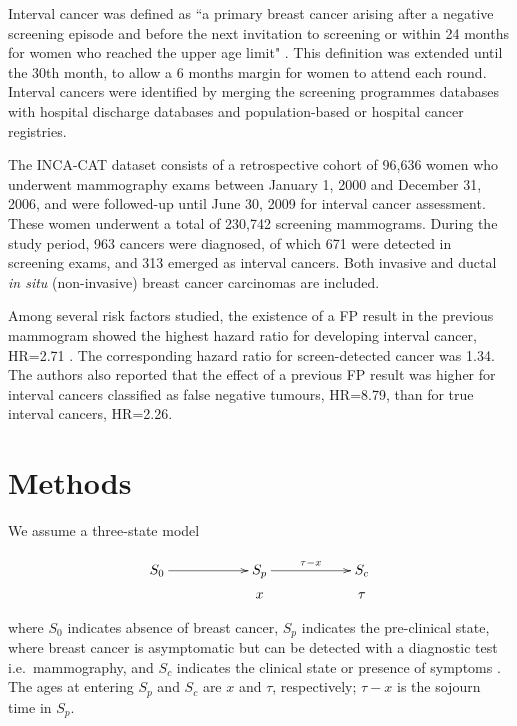 \documentclass{bmcart}
\begin{document}
Interval cancer was defined as ``a primary breast cancer arising after a negative screening episode
and before the next invitation to screening or within 24 months for women who reached the upper age
limit" \cite{Perry2008}. This definition was extended until the 30th month, to allow a 6 months
margin for women to attend each round. Interval cancers were identified by merging the screening
programmes databases with hospital discharge databases and population-based or hospital cancer
registries. 

The INCA-CAT dataset consists of a retrospective cohort of 96,636 women who underwent mammography
exams between January 1, 2000 and December 31, 2006, and were followed-up until June 30, 2009 for
interval cancer assessment. These women underwent a total of 230,742 screening mammograms. During
the study period, 963 cancers were diagnosed, of which 671 were detected in screening exams, and
313 emerged as interval cancers. Both invasive and ductal \textit{in situ} (non-invasive) breast
cancer carcinomas are included. 

Among several risk factors studied, the existence of a FP result in the previous
mammogram showed the highest hazard ratio for developing interval cancer, HR=2.71
\cite{Blanch2014}. The corresponding hazard ratio for screen-detected cancer was 1.34. The authors
also reported that the effect of a previous FP result was higher for interval cancers
classified as false negative tumours, HR=8.79, than for true interval cancers, HR=2.26.

\section*{Methods}
We assume a three-state model 

\begin{displaymath}
\centering
\xymatrix @R=0.15cm @C=2cm {
S_0 \ar@{->}[r] & S_p \ar@{->}[r]^{\tau-x} & S_c \\
 & x & \tau \\
}
\end{displaymath}

where $S_0$ indicates absence of breast cancer, $S_p$ indicates the pre-clinical state, where
breast cancer is asymptomatic but can be detected with a diagnostic test i.e.\ mammography, and
$S_c$ indicates the clinical state or presence of symptoms \cite{Lee1998, Lee2003b}.  The ages at
entering $S_p$ and $S_c$ are $x$ and $\tau$, respectively; $\tau-x$ is the sojourn time in $S_p$. 
\end{document}
